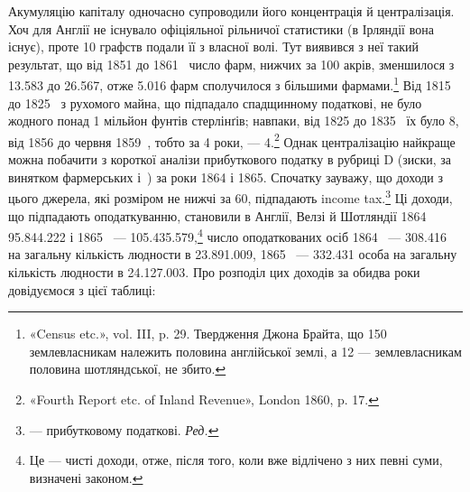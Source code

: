Акумуляцію капіталу одночасно супроводили його концентрація
й централізація. Хоч для Англії не існувало офіціяльної
рільничої статистики (в Ірляндії вона існує), проте 10 графств подали
її з власної волі. Тут виявився з неї такий результат, що від
1851 до 1861~ число фарм, нижчих за 100 акрів, зменшилося з
\num{13.583} до \num{26.567}, отже \num{5.016} фарм сполучилося з більшими фармами.\footnote{
«Census etc.», vol. III, p. 29. Твердження Джона Брайта, що 150
землевласникам належить половина англійської землі, а 12 — землевласникам
половина шотляндської, не збито.
}  Від 1815 до 1825~ з рухомого майна, що підпадало спадщинному
податкові, не було жодного понад 1 мільйон фунтів стерлінґів;
навпаки, від 1825 до 1835~ їх було 8, від 1856 до червня
1859~, тобто за 4 роки, — 4.\footnote{
«Fourth Report etc. of Inland Revenue», London 1860, p. 17.
} Однак централізацію найкраще
можна побачити з короткої аналізи прибуткового податку
в рубриці D (зиски, за винятком фармерських і~) за роки
1864 і 1865. Спочатку зауважу, що доходи з цього джерела,
які розміром не нижчі за 60, підпадають
income tax.\footnote*{
— прибутковому податкові. \emph{Ред.}
} Ці доходи, що підпадають оподаткуванню, становили
в Англії, Велзі й Шотляндії 1864~ \num{95.844.222}
і 1865~ — \num{105.435.579},\footnote{
Це — чисті доходи, отже, після того, коли вже відлічено з них
певні суми, визначені законом.
} число оподаткованих
осіб 1864~ — \num{308.416} на загальну кількість людности в
\num{23.891.009}, 1865~ — \num{332.431} особа на загальну кількість людности
в \num{24.127.003}. Про розподіл цих доходів за обидва роки
довідуємося з цієї таблиці:
